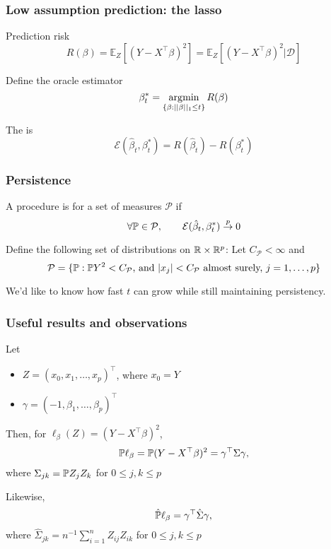 \documentclass[12pt]{beamer}
\begin{document}
\begin{frame}
\frametitle{Low assumption prediction: the lasso}
  Prediction risk
  \[
  R(\beta) 
  = 
  \mathbb{E}_Z \left[\left(Y - X^\top \beta\right)^2 \right]
  =
  \mathbb{E}_Z \left[\left(Y - X^\top \beta\right)^2 | \mathcal{D}\right]
  \]

  \vsp
  Define the oracle estimator
  \[
  \beta_t^* = \argmin_{\{\beta:||\beta||_1 \leq t\}} R(\beta)
  \]

  \vsp
  The  is
  \[
  \mathcal{E}(\hat\beta_t,\beta_t^*) = R(\hat\beta_t) - R(\beta_t^*)
  \]
\end{frame}

\begin{frame}
  \frametitle{Persistence}
 
  A procedure is  for a set of measures $\mathcal{P}$ if 
  \[
\forall \P \in \mathcal{P}, \qquad  \mathcal{E}(\hat\beta_t,\beta_t^*) \stackrel{p}{\rightarrow} 0
  \]
  \vsp

Define the following set of distributions on $\R \times \R^p$: Let $C_\mathcal{P} < \infty$ and 
\[
\mathcal{P} = \{ \P: \P Y^2 < C_\mathcal{P}\textrm{, and } |x_j| < C_\mathcal{P} \textrm{ almost surely, } j = 1,\ldots,p\}
\]

\vsp
We'd like to know how fast $t$ can grow while still maintaining persistency. 

\end{frame}

\begin{frame}
  \frametitle{Useful results and observations}
Let 
\begin{itemize}
\item $Z = (x_0, x_1, \ldots, x_p)^{\top}$, where $x_0 = Y$
\item $\gamma = (-1,\beta_1,\ldots,\beta_p)^{\top}$
\end{itemize}
Then, for $\ell_\beta(Z) = (Y - X^{\top}\beta)^2$,
\[
\P \ell_{\beta} = \P(Y - X^{\top}\beta)^2 = \gamma^{\top} \Sigma \gamma,
\]
where $\Sigma_{jk} = \P Z_j Z_k$ for $0 \leq j,k \leq p$

\vsp
Likewise, 
\[
\hat{\P}\ell_{\beta} = \gamma^{\top} \hat\Sigma \gamma,
\]
where $\hat\Sigma_{jk} = n^{-1} \sum_{i = 1}^n Z_{ij}Z_{ik}$ for $0 \leq j,k \leq p$

\end{frame}
\end{document}
